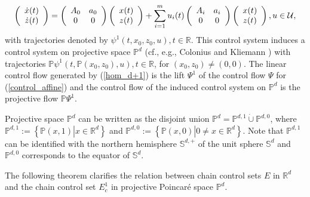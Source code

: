 	\begin{equation}
		\left(
		\begin{array}
			[c]{c}%
			\dot{x}(t)\\
			\dot{z}(t)
		\end{array}
		\right)  =\left(
		\begin{array}
			[c]{cc}%
			A_{0} & a_{0}\\
			0 & 0
		\end{array}
		\right)  \left(
		\begin{array}
			[c]{c}%
			x(t)\\
			z(t)
		\end{array}
		\right)  +\sum_{i=1}^{m}u_{i}(t)\left(
		\begin{array}
			[c]{cc}%
			A_{i} & a_{i}\\
			0 & 0
		\end{array}
		\right)  \left(
		\begin{array}
			[c]{c}%
			x(t)\\
			z(t)
		\end{array}
		\right)  ,u\in\mathcal{U},\label{hom_d+1}%
	\end{equation}
	with trajectories denoted by $\psi^{1}(t,x_{0},z_{0},u),t\in\mathbb{R}$. This
	control system induces a control system on projective space $\mathbb{P}^{d}$
	(cf., e.g., Colonius and Kliemann \cite[Chapter 6]{ColK00}) with trajectories
	$\mathbb{P}\psi^{1}(t,\mathbb{P}(x_{0},z_{0}),u),t\in\mathbb{R}$, for
	$(x_{0},z_{0})\not =(0,0)$. The linear control flow generated by
	(\ref{hom_d+1}) is the lift $\Psi^{1}$ of the control flow $\Psi$ for
	(\ref{control_affine}) and the control flow of the induced control system on
	$\mathbb{P}^{d}$ is the projective flow $\mathbb{P}\Psi^{1}$.
	
	Projective space $\mathbb{P}^{d}$ can be written as the disjoint union
	$\mathbb{P}^{d}=\mathbb{P}^{d,1}\dot{\cup}\mathbb{P}^{d,0}$, where
	$\mathbb{P}^{d,1}:=\left\{  \mathbb{P}(x,1)\left\vert x\in\mathbb{R}%
	^{d}\right.  \right\}  $ and $\mathbb{P}^{d,0}:=\left\{  \mathbb{P}%
	(x,0)\left\vert 0\not =x\in\mathbb{R}^{d}\right.  \right\}  $. Note that
	$\mathbb{P}^{d,1}$ can be identified with the northern hemisphere
	$\mathbb{S}^{d,+}$ of the unit sphere $\mathbb{S}^{d}$ and $\mathbb{P}^{d,0}$
	corresponds to the equator of $\mathbb{S}^{d}$.
	
	The following theorem clarifies the relation between chain control sets $E$ in
	$\mathbb{R}^{d}$ and the chain control set $E_{c}^{1}$ in projective
	Poincar\'{e} space $\mathbb{P}^{d}$.
	
